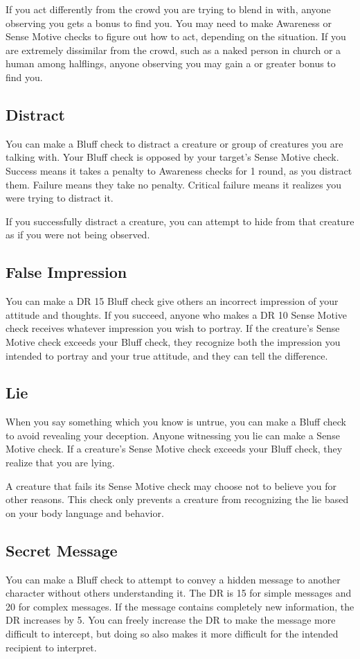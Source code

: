         If you act differently from the crowd you are trying to blend in with, anyone observing you gets a  bonus to find you. You may need to make Awareness or Sense Motive checks to figure out how to act, depending on the situation. If you are extremely dissimilar from the crowd, such as a naked person in church or a human among halflings, anyone observing you may gain a  or greater bonus to find you.

    \subsection{Distract}
        You can make a Bluff check to distract a creature or group of creatures you are talking with. Your Bluff check is opposed by your target's Sense Motive check. Success means it takes a  penalty to Awareness checks for 1 round, as you distract them. Failure means they take no penalty. Critical failure means it realizes you were trying to distract it.

        If you successfully distract a creature, you can attempt to hide from that creature as if you were not being observed.

    \subsection{False Impression}
        You can make a DR 15 Bluff check give others an incorrect impression of your attitude and thoughts. If you succeed, anyone who makes a DR 10 Sense Motive check receives whatever impression you wish to portray. If the creature's Sense Motive check exceeds your Bluff check, they recognize both the impression you intended to portray and your true attitude, and they can tell the difference.

    \subsection{Lie}
        When you say something which you know is untrue, you can make a Bluff check to avoid revealing your deception. Anyone witnessing you lie can make a Sense Motive check. If a creature's Sense Motive check exceeds your Bluff check, they realize that you are lying.

        A creature that fails its Sense Motive check may choose not to believe you for other reasons. This check only prevents a creature from recognizing the lie based on your body language and behavior.

    \subsection{Secret Message}
        You can make a Bluff check to attempt to convey a hidden message to another character without others understanding it. The DR is 15 for simple messages and 20 for complex messages. If the message contains completely new information, the DR increases by 5. You can freely increase the DR to make the message more difficult to intercept, but doing so also makes it more difficult for the intended recipient to interpret.

